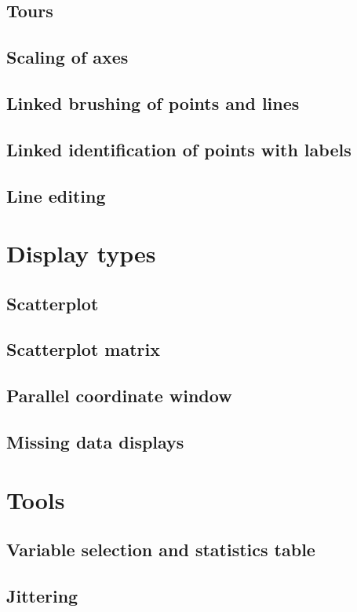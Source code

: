 \documentclass[11pt]{article}
\begin{document}
\subsection{Tours}
\label{slbl:1DTour}
\subsection{Scaling of axes}
\label{slbl:Scaling}
\subsection{Linked brushing of points and lines}
\label{slbl:Color}
\subsection{Linked identification of points with labels}
\subsection{Line editing}

\section {Display types}
\subsection{Scatterplot}
\subsection{Scatterplot matrix}
\subsection{Parallel coordinate window}
\subsection{Missing data displays}

\newpage
\section{Tools}
\subsection{Variable selection and statistics table}
\label{slbl:VarStats}
\subsection{Jittering}
\end{document}
